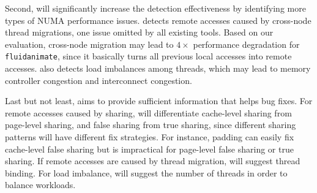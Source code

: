Second, \NP{} will significantly increase the detection effectiveness by identifying more types of NUMA performance issues. \NP{} detects remote accesses caused by cross-node thread migrations, one issue omitted by all existing tools. Based on our evaluation, cross-node migration may lead to $4\times$ performance degradation for \texttt{fluidanimate}, since it basically turns all previous local accesses into remote accesses. 
\NP{} also detects load imbalances among threads, which may lead to memory controller congestion and interconnect congestion. 

Last but not least, \NP{} aims to provide sufficient information that helps bug fixes. For remote accesses caused by sharing, \NP{} will differentiate  cache-level sharing from page-level sharing, and false sharing from true sharing, since different sharing patterns will have different fix strategies. For instance, padding can easily fix cache-level false sharing but is impractical for page-level false sharing or true sharing. If remote accesses are caused by thread migration, \NP{} will suggest thread binding. For load imbalance, \NP{} will suggest the number of threads in order to balance workloads. 



